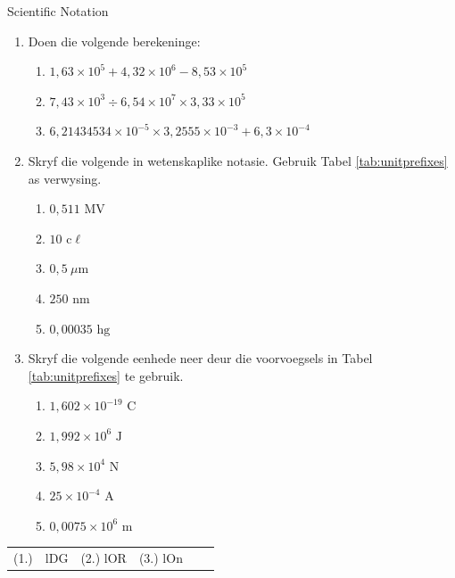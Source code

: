 \begin{exercises}{Scientific Notation }
            \nopagebreak \noindent
\begin{enumerate}[noitemsep, label=\textbf{\arabic*}. ] 
 \item Doen die volgende berekeninge:
    \begin{enumerate}[noitemsep, label=\textbf{\alph*}. ] 
     \item $1,63 \times 10^{5} + 4,32 \times 10^{6} - 8,53 \times 10^{5}$
     \item $7,43 \times 10^{3} \div 6,54 \times 10^{7} \times 3,33 \times 10^{5}$
     \item $6,21434534 \times 10^{-5} \times 3,2555 \times 10^{-3} + 6,3 \times 10^{-4}$
    \end{enumerate}
  \item Skryf die volgende in wetenskaplike notasie. Gebruik Tabel \ref{tab:unitprefixes} as verwysing.
    \begin{enumerate}[noitemsep, label=\textbf{\alph*}. ] 
      \item $0,511 \text{ MV}$
      \item $10 \text{ c}\ell $
      \item $0,5 ~\mu\text{m}$
      \item $250 \text{ nm}$
      \item $0,00035 \text{ hg}$
    \end{enumerate}
  \item Skryf die volgende eenhede neer deur die voorvoegsels in Tabel \ref{tab:unitprefixes} te gebruik.
    \begin{enumerate}[noitemsep, label=\textbf{\alph*}. ] 
      \item $1,602 \times{10}^{-19} \text{ C}$
      \item $1,992 \times{10}^{6} \text { J}$
      \item $5,98 \times{10}^{4} \text{ N}$
      \item $25 \times{10}^{-4} \text{ A}$
      \item $0,0075 \times{10}^{6} \text{ m}$
    \end{enumerate}
\end{enumerate}
\par \practiceinfo
 \par \begin{tabular}[h]{cccccc}
(1.) & lDG & (2.) lOR  &  (3.) lOn  & \end{tabular}
\end{exercises}
